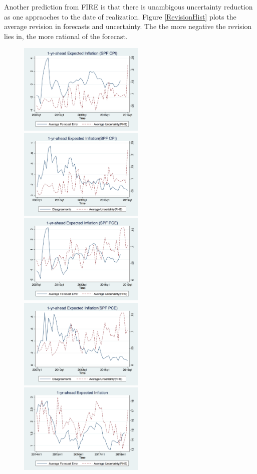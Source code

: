 \documentclass[]{article}
\begin{document}
Another prediction from FIRE is that there is unambigous uncertainty reduction as one appraoches to the date of realization. Figure \ref{RevisionHist} plots the average revision in forecasts and uncertainty. The the more negative the revision lies in, the more rational of the forecast.  


\begin{figure}[h]\label{UnceratitnyOtherMoments}
	\centering
	\includegraphics[width=6cm]{figures/fe_var2Q.png}
	\includegraphics[width=6cm]{figures/var_disg2Q.png}\\
	\smallskip
	\includegraphics[width=6cm]{figures/fe_var3Q.png}
	\includegraphics[width=6cm]{figures/var_disg3Q.png}\\
	\smallskip	
	\includegraphics[width=6cm]{figures/fe_var.png}

\end{figure}
\end{document}
